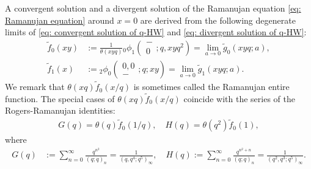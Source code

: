 \documentclass[a4paper]{article}
\newcommand{\hyper}[4]{\left( \begin{matrix} #1 \\ #2 \end{matrix};#3;#4\right)}
\numberwithin{equation}{section}
\theoremstyle{plain}
\begin{document}
A convergent solution and a divergent solution of the Ramanujan equation \eqref{eq: Ramanujan equation} around $x=0$ are derived from the following degenerate limits of \eqref{eq: convergent solution of q-HW} and \eqref{eq: divergent solution of q-HW}: 
\begin{align*}
\widetilde{f}_0(xy)&:=\frac{1}{\theta(xy q)}{}_0\phi_{1}\left(\begin{matrix} - \\ 0 \end{matrix};q,xy q^2\right)=\lim_{a\to0}\widetilde{g}_0(xyq;a), \\
\widetilde{f}_1(x)&:={}_2\phi_0\hyper{0,0}{-}{q}{xy}=\lim_{a\to0}\widetilde{g}_1(xyq;a). 
\end{align*}
We remark that $\theta(xq)\widetilde{f}_0(x/q)$ is sometimes called the Ramanujan entire function. 
The special cases of $\theta(xq)\widetilde{f}_0(x/q)$ coincide with the series of the Rogers-Ramanujan identities:
\begin{align*}
G(q)=\theta(q)\widetilde{f}_0(1/q),\quad H(q)=\theta\left(q^2\right)\widetilde{f}_0(1), 
\end{align*} 
where
\begin{align*}
G(q)&:=\sum_{n=0}^\infty\frac{q^{n^2}}{(q;q)_n}=\frac{1}{\left(q,q^4;q^5\right)_\infty}, \quad H(q):=\sum_{n=0}^\infty\frac{q^{n^2+n}}{(q;q)_n}=\frac{1}{\left(q^2,q^3;q^5\right)_\infty}. 
\end{align*}
\end{document}
